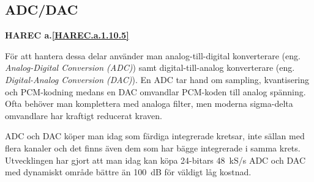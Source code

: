 \subsection{ADC/DAC}
\textbf{HAREC a.\ref{HAREC.a.1.10.5}\label{myHAREC.a.1.10.5}}

För att hantera dessa delar använder man analog-till-digital konverterare
(eng. \emph{Analog-Digital Conversion (ADC)}) samt digital-till-analog
konverterare (eng. \emph{Digital-Analog Conversion (DAC)}).
En ADC tar hand om sampling, kvantisering och PCM-kodning medans en DAC
omvandlar PCM-koden till analog spänning.
Ofta behöver man komplettera med analoga filter, men moderna sigma-delta
omvandlare har kraftigt reducerat kraven.

ADC och DAC köper man idag som färdiga integrerade kretsar, inte sällan med
flera kanaler och det finns även dem som har bägge integrerade i samma krets.
Utvecklingen har gjort att man idag kan köpa 24-bitars 48~kS/s ADC och DAC med
dynamiskt område bättre än 100~dB för väldigt låg kostnad.
